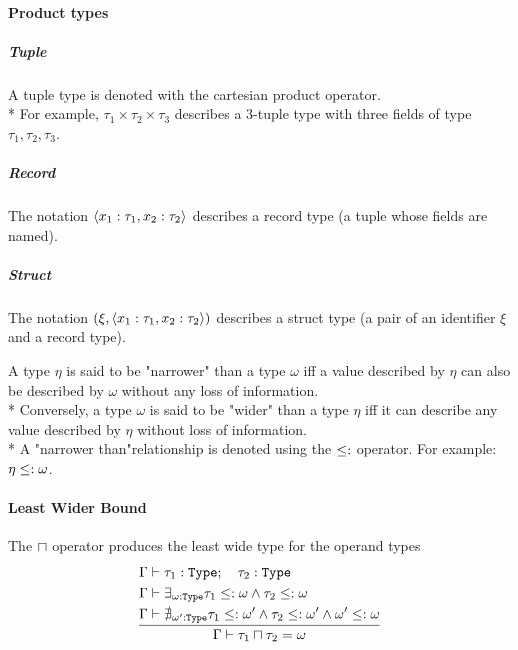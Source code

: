 \paragraph{Product types}

\subparagraph{Tuple} A tuple type is denoted with the cartesian product
operator.\\*
For example, $\tau_1 \times \tau_2 \times \tau_3$ describes a 3-tuple type
with three fields of type $\tau_1, \tau_2, \tau_3$.

\subparagraph{Record} The notation $\tuple{x_1:\tau_1, x_2:\tau_2}$ describes a
record type (a tuple whose fields are named).

\subparagraph{Struct} The notation $(\xi, \tuple{x_1:\tau_1, x_2:\tau_2})$
describes a struct type (a pair of an identifier $\xi$ and a record type).

\begin{definition}
	A type $\eta$ is said to be "narrower" than a type $\omega$ iff a value
	described by $\eta$ can also be described by $\omega$ without any loss of
	information\footnotemark[1].\\*
	Conversely, a type $\omega$ is said to be "wider" than a type $\eta$ iff it
	can describe any value described by $\eta$ without loss of information.\\*
	A "narrower than"\footnotemark[2] relationship is denoted using
	the $\narreq$ operator. For example: $\eta\narreq\omega$.
\end{definition}



\paragraph{Least Wider Bound} The $\lwb$ operator produces the least wide type
for the operand types
\[
	\infrule[aligned]{
		\EnvSym & \then \tau_1:\Type \semiq \tau_2:\Type \\*
		\EnvSym & \then \exists_{\omega:\Type}{\tau_1\narreq\omega \land \tau_2\narreq\omega} \\*
		\EnvSym & \then \nexists_{\omega':\Type}{\tau_1\narreq\omega' \land \tau_2\narreq\omega' \land \omega'\narreq\omega}
	}{
		\EnvSym\then \tau_1 \lwb \tau_2 = \omega
	}
\]

